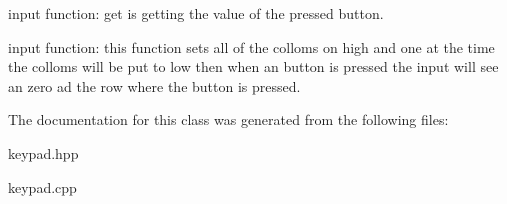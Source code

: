 input function\+: get is getting the value of the pressed button. 

input function\+: this function sets all of the colloms on high and one at the time the colloms will be put to low then when an button is pressed the input will see an zero ad the row where the button is pressed. 

The documentation for this class was generated from the following files\+:\begin{DoxyCompactItemize}
\item 
keypad.\+hpp\item 
keypad.\+cpp\end{DoxyCompactItemize}
